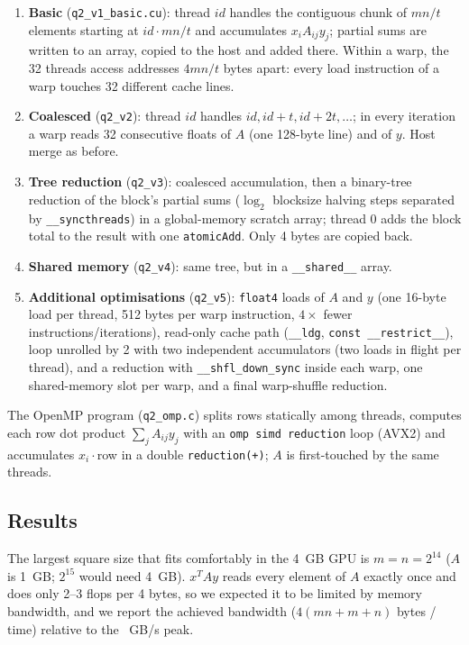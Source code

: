 \documentclass[10pt,a4paper]{article}
\begin{document}
\begin{enumerate}
\item \textbf{Basic} (\texttt{q2\_v1\_basic.cu}): thread $id$ handles the
  contiguous chunk of $mn/t$ elements starting at $id\cdot mn/t$ and
  accumulates $x_iA_{ij}y_j$; partial sums are written to an array, copied to
  the host and added there. Within a warp, the 32 threads access addresses
  $4mn/t$ bytes apart: every load instruction of a warp touches 32 different
  cache lines.
\item \textbf{Coalesced} (\texttt{q2\_v2}): thread $id$ handles $id, id+t,
  id+2t,\dots$; in every iteration a warp reads 32 consecutive floats of $A$
  (one 128-byte line) and of $y$. Host merge as before.
\item \textbf{Tree reduction} (\texttt{q2\_v3}): coalesced accumulation, then
  a binary-tree reduction of the block's partial sums ($\log_2$ blocksize
  halving steps separated by \texttt{\_\_syncthreads}) in a global-memory
  scratch array; thread 0 adds the block total to the result with one
  \texttt{atomicAdd}. Only 4 bytes are copied back.
\item \textbf{Shared memory} (\texttt{q2\_v4}): same tree, but in a
  \texttt{\_\_shared\_\_} array.
\item \textbf{Additional optimisations} (\texttt{q2\_v5}): \texttt{float4}
  loads of $A$ and $y$ (one 16-byte load per thread, 512 bytes per warp
  instruction, $4\times$ fewer instructions/iterations), read-only cache path
  (\texttt{\_\_ldg}, \texttt{const \_\_restrict\_\_}), loop unrolled by 2 with
  two independent accumulators (two loads in flight per thread), and a
  reduction with \texttt{\_\_shfl\_down\_sync} inside each warp, one
  shared-memory slot per warp, and a final warp-shuffle reduction.
\end{enumerate}
The OpenMP program (\texttt{q2\_omp.c}) splits rows statically among threads,
computes each row dot product $\sum_j A_{ij}y_j$ with an
\texttt{omp simd reduction} loop (AVX2) and accumulates $x_i\cdot$row in a
double \texttt{reduction(+)}; $A$ is first-touched by the same threads.

\subsection{Results}
The largest square size that fits comfortably in the 4~GB GPU is
$m=n=2^{14}$ ($A$ is 1~GB; $2^{15}$ would need 4~GB). $x^TAy$ reads every
element of $A$ exactly once and does only 2--3 flops per 4 bytes, so we expected
it to be limited by memory bandwidth, and we report the achieved bandwidth
($4(mn+m+n)$ bytes / time) relative to the \devpeakbandwidthgbs~GB/s peak.

\end{document}
